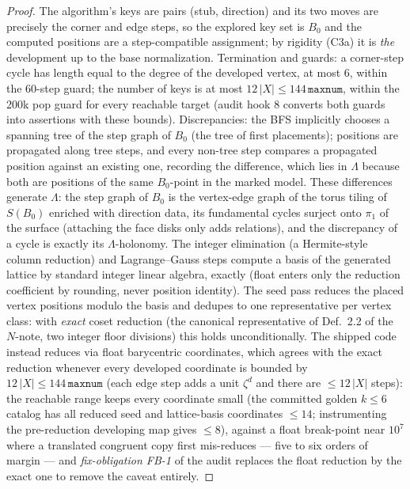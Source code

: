 \documentclass[11pt]{article}
\theoremstyle{definition}
\begin{document}
\begin{proof}
The algorithm's keys are pairs (stub, direction) and its two moves are precisely the
corner and edge steps, so the explored key set is $B_0$ and the computed positions are a
step-compatible assignment; by rigidity (C3a) it is \emph{the} development up to the
base normalization. Termination and guards: a corner-step cycle has length equal to the
degree of the developed vertex, at most $6$, within the 60-step guard; the number of
keys is at most $12\,|X| \le 144\,\texttt{maxnum}$, within the 200k pop guard for every
reachable target (audit hook 8 converts both guards into assertions with these bounds).
Discrepancies: the BFS implicitly chooses a spanning tree of the step graph of $B_0$
(the tree of first placements); positions are propagated along tree steps, and every
non-tree step compares a propagated position against an existing one, recording the
difference, which lies in $\Lambda$ because both are positions of the same
$B_0$-point in the marked model. These differences generate $\Lambda$: the step graph of
$B_0$ is the vertex-edge graph of the torus tiling of $S(B_0)$ enriched with direction
data, its fundamental cycles surject onto $\pi_1$ of the surface (attaching the face
disks only adds relations), and the discrepancy of a cycle is exactly its
$\Lambda$-holonomy. The integer elimination (a Hermite-style column reduction) and
Lagrange--Gauss steps compute a basis of the generated lattice by standard integer
linear algebra, exactly (float enters only the reduction coefficient by rounding, never
position identity). The seed pass reduces the placed vertex positions modulo the basis
and dedupes to one representative per vertex class: with \emph{exact} coset reduction
(the canonical representative of Def.~2.2 of the $N$-note, two integer floor divisions)
this holds unconditionally. The shipped code instead reduces via float barycentric
coordinates, which agrees with the exact reduction whenever every developed coordinate
is bounded by $12\,|X| \le 144\,\texttt{maxnum}$ (each edge step adds a unit $\zeta^d$
and there are $\le 12\,|X|$ steps): the reachable range keeps every coordinate small (the
committed golden $k \le 6$ catalog has all reduced seed and lattice-basis coordinates
$\le 14$; instrumenting the pre-reduction developing map gives $\le 8$), against a float
break-point near $10^7$ where a translated congruent copy first mis-reduces --- five to
six orders of margin --- and \emph{fix-obligation FB-1} of the audit replaces the float
reduction by the exact one to remove the caveat entirely.
\end{proof}
\end{document}
